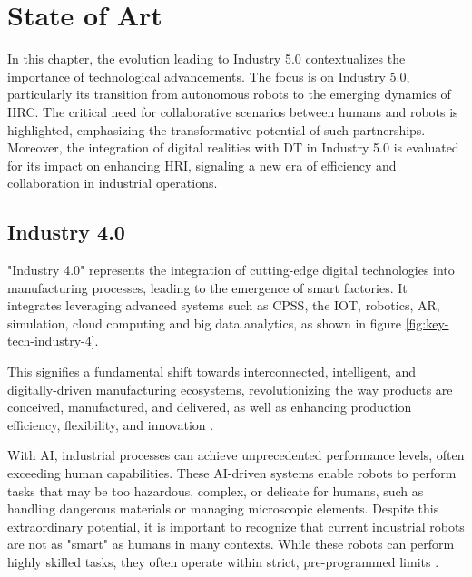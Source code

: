 \chapter{State of Art}%
\label{chapter:stateofart}


\begin{introduction}
In this chapter, the evolution leading to Industry 5.0 contextualizes the importance of technological advancements. 
The focus is on Industry 5.0, particularly its transition from autonomous robots to the emerging dynamics of \ac{HRC}.
The critical need for collaborative scenarios between humans and robots is highlighted, emphasizing the transformative potential of such partnerships. 
Moreover, the integration of digital realities with \ac{DT} in Industry 5.0 is evaluated for its impact on enhancing \ac{HRI}, signaling a new era of efficiency and 
collaboration in industrial operations.
\end{introduction}


\section{Industry 4.0}
\label{section:industry-4}
"Industry 4.0" represents the integration of cutting-edge digital technologies into manufacturing processes, leading to the emergence of smart factories. 
It integrates leveraging advanced systems such as \ac{CPSS}, the \ac{IOT}, robotics, \ac{AR}, simulation, cloud computing and big data analytics,
as shown in figure \ref{fig:key-tech-industry-4}.

This signifies a fundamental shift towards interconnected, intelligent, and digitally-driven manufacturing ecosystems, revolutionizing the way products are conceived, manufactured, 
and delivered, as well as enhancing production efficiency, flexibility, and innovation \cite{Moller2022,Ahmed2022}.

With \ac{AI}, industrial processes can achieve unprecedented performance levels, often exceeding human capabilities. These \ac{AI}-driven systems 
enable robots to perform tasks that may be too hazardous, complex, or delicate for humans, such as handling dangerous materials or managing 
microscopic elements. 
Despite this extraordinary potential, it is important to recognize that current industrial robots are not as "smart" as humans in many contexts. 
While these robots can perform highly skilled tasks, they often operate within strict, pre-programmed limits \cite{Ahmed2022}.

